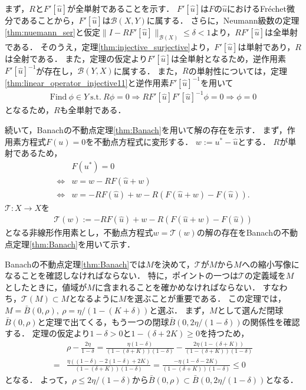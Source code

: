 \begin{Proof}
	まず，$R$と$F'[\hat{u}]$が全単射であることを示す．
	$F'[\hat{u}]$は$F$の$\hat{u}$におけるFr\'echet微分であることから，$F'[\hat{u}]$は${\mathcal B}(X, Y)$に属する．
	さらに，Neumann級数の定理\ref{thm:nuemann_ser}と仮定$\| I -  R F'[\hat{u}] \|_{{\mathcal B}(X)} \le \delta < 1$より，$R F'[\hat{u}]$は全単射である．
	そのうえ，定理\ref{thm:injective_surjective}より，$F'[\hat{u}]$は単射であり，$R$は全射である．
	また，定理の仮定より$F'[\hat{u}]$は全単射となるため，逆作用素$F'[\hat{u}]^{-1}$が存在し，${\mathcal B}(Y, X)$に属する．
	また，$R$の単射性については，定理\ref{thm:linear_operator_injective11}と逆作用素$F'[\hat{u}]^{-1}$を用いて
	\begin{align*}
		\mbox{Find} ~  \phi \in Y ~ \mbox{s.t.} ~ R \phi = 0 \Rightarrow  R F'[\hat{u}] F'[\hat{u}]^{-1} \phi = 0 \Rightarrow \phi = 0
	\end{align*}
	となるため，$R$も全単射である．

	
	続いて，Banachの不動点定理\ref{thm:Banach}を用いて解の存在を示す．
	まず，作用素方程式$F(u) = 0$を不動点方程式に変形する．
	$w := u^* - \hat{u}$とする．
	$R$が単射であるため，
	\begin{align*}
		& F(u^*) = 0 \\
	\Leftrightarrow	& w = w - R F(\hat{u} + w) \\
	\Leftrightarrow	& w = -R F(\hat{u}) +  w - R \left(  F(\hat{u} + w) - F(\hat{u})  \right).
	\end{align*}
	${\mathcal T}: X \rightarrow X$を
	\begin{align*}
		{\mathcal T}(w) := -R F(\hat{u}) +  w - R \left( F(\hat{u} + w) - F(\hat{u}) \right)
	\end{align*}
	となる非線形作用素とし，不動点方程式$w = {\mathcal T}(w)$の解の存在をBanachの不動点定理\ref{thm:Banach}を用いて示す．	
	
	Banachの不動点定理\ref{thm:Banach}では$M$を決めて，${\mathcal T}$が$M$から$M$への縮小写像になることを確認しなければならない．
	特に，ポイントの一つは${\mathcal T}$の定義域を$M$としたときに，値域が$M$に含まれることを確かめなければならない．
	すなわち，${\mathcal T}(M) \subset M$となるように$M$を選ぶことが重要である．
	この定理では，$M = \bar{B}(0, \rho), ~ \rho = \eta /(1 - (K+\delta))$と選ぶ．
	まず，$M$として選んだ閉球$\bar{B}(0, \rho)$と定理で出てくる，もう一つの閉球$\bar{B}(0, 2\eta/(1 - \delta))$の関係性を確認する．	
	定理の仮定より$1 - \delta > 0$と$1 - (\delta + 2 K) \ge 0$を持つため，
	\begin{align*}
		& \rho -  \frac{2\eta}{1 - \delta} = \frac{ \eta (1 - \delta) }{(1 - (\delta + K))(1 - \delta)} - \frac{ 2 \eta (1 - (\delta + K)) }{(1 - (\delta + K))(1 - \delta)} \\
		=& \frac{ \eta \left( (1 - \delta) - 2  (1 - \delta ) + 2 K \right) }{(1 - (\delta +  K))(1 - \delta)} = \frac{ - \eta \left( 1 - \delta - 2 K \right) }{(1 - (\delta + K))(1 - \delta)} \le 0
	\end{align*}
	となる．
	よって，$\rho \le 2\eta/(1 - \delta) $から$\bar{B}(0, \rho) \subset \bar{B}(0, 2\eta/(1 - \delta))$となる．
	

\end{Proof}
